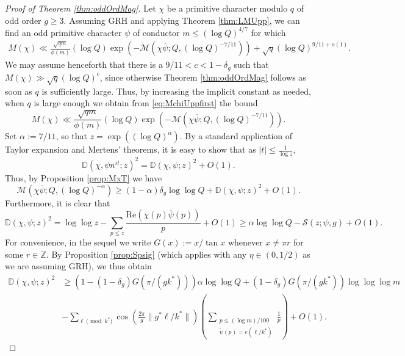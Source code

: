 \documentclass[10pt]{amsart}
\theoremstyle{definition}
\newcommand{\mc}{\mathcal}
\newcommand{\mb}{\mathbb}
\renewcommand{\ss}{\substack}
\renewcommand{\bar}{\overline}
\begin{document}
\begin{proof}[Proof of Theorem \ref{thm:oddOrdMag}]
Let $\chi$ be a primitive character modulo $q$ of odd order $g \geq 3$. Assuming GRH and applying Theorem \ref{thm:LMUpp}, we can find an odd primitive character $\psi$ of conductor $m \leq (\log Q)^{4/7}$ for which
\begin{align} \label{eq:MchiUppfirst}
M(\chi) \ll \frac{\sqrt{qm}}{\phi(m)}(\log Q) \exp\left(-\mc{M}(\chi\bar{\psi}; Q,(\log Q)^{-7/11})\right) + \sqrt{q}(\log Q)^{9/11 + o(1)}.
\end{align}
We may assume henceforth that there is a $9/11< c < 1-\delta_g$ such that $M(\chi) \gg \sqrt{q} (\log Q)^c$, since otherwise Theorem \ref{thm:oddOrdMag} follows as soon as $q$ is sufficiently large. Thus, by increasing the implicit constant as needed, when $q$ is large enough we obtain from \eqref{eq:MchiUppfirst} the bound
\begin{equation}\label{eq:MchiUpp}
M(\chi) \ll \frac{\sqrt{qm}}{\phi(m)}(\log Q) \exp\left(-\mc{M}(\chi\bar{\psi}; Q,(\log Q)^{-7/11})\right).
\end{equation}
Set $\alpha := 7/11$, so that $z = \exp((\log Q)^\alpha)$. By a standard application of Taylor expansion and Mertens' theorems, it is easy to show that as $|t| \leq \tfrac{1}{\log z}$,
$$
\mb{D}(\chi,\psi n^{it};z)^2 = \mb{D}(\chi,\psi; z)^2 + O(1).
$$
Thus, by Proposition \ref{prop:MxT} we have
\begin{equation}\label{eq:McmBd}
\mc{M}(\chi\bar{\psi}; Q,(\log Q)^{-\alpha}) \geq (1-\alpha) \delta_g\log\log Q + \mb{D}(\chi,\psi; z)^2 + O(1).
\end{equation}
Furthermore, it is clear that
$$
\mb{D}(\chi,\psi;z)^2 = \log\log z - \sum_{p \leq z} \frac{\text{Re}(\chi(p)\bar{\psi}(p))}{p} +O(1) \geq \alpha \log\log Q - \mc{S}(z;\psi,g) + O(1).
$$
For convenience, in the sequel we write $G(x) := x/\tan x$ whenever $x \neq \pi r$ for some $r \in \mb{Z}$. By Proposition \ref{prop:Spsig} (which applies with any $\eta \in (0,1/2)$ as we are assuming GRH), we thus obtain
\begin{align*}
\mb{D}(\chi,\psi;z)^2 &\geq  \left(1-(1-\delta_g)G(\pi/(gk^\ast))\right) \alpha\log\log Q + (1-\delta_g)G(\pi/(gk^{\ast}))\log\log\log m \\
&-\sum_{\ell \pmod{k^\ast}} \cos(\tfrac{2\pi}{g}\|g^\ast \ell/k^\ast\|)\left(\sum_{\ss{p \leq (\log m)/100 \\ \tilde{\psi}(p) = e(\ell/k^\ast)}} \frac{1}{p}\right) + O(1).
\end{align*}

\end{proof}
\end{document}
